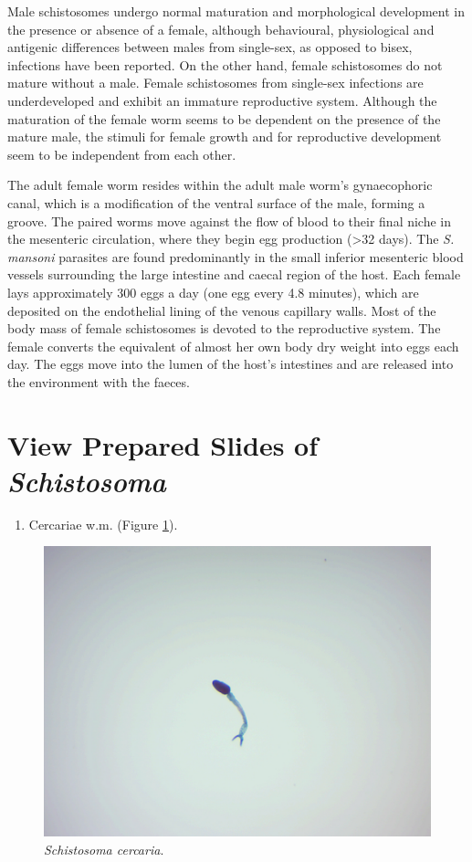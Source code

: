 Male schistosomes undergo normal maturation and morphological
development in the presence or absence of a female, although
behavioural, physiological and antigenic differences between males from
single-sex, as opposed to bisex, infections have been reported. On the
other hand, female schistosomes do not mature without a male. Female
schistosomes from single-sex infections are underdeveloped and exhibit
an immature reproductive system. Although the maturation of the female
worm seems to be dependent on the presence of the mature male, the
stimuli for female growth and for reproductive development seem to be
independent from each other.

The adult female worm resides within the adult male worm's gynaecophoric
canal, which is a modification of the ventral surface of the male,
forming a groove. The paired worms move against the flow of blood to
their final niche in the mesenteric circulation, where they begin egg
production (\textgreater{}32 days). The \emph{S. mansoni} parasites are found
predominantly in the small inferior mesenteric blood vessels surrounding
the large intestine and caecal region of the host. Each female lays
approximately 300 eggs a day (one egg every 4.8 minutes), which are
deposited on the endothelial lining of the venous capillary walls. Most
of the body mass of female schistosomes is devoted to the reproductive
system. The female converts the equivalent of almost her own body dry
weight into eggs each day. The eggs move into the lumen of the host's
intestines and are released into the environment with the faeces.

\section{\texorpdfstring{View Prepared Slides of
\emph{Schistosoma}}{View Prepared Slides of Schistosoma}}\label{view-prepared-slides-of-schistosoma}

\begin{enumerate}
\def\labelenumi{\arabic{enumi}.}
\tightlist
\item
  Cercariae w.m. (Figure \ref{fig:cercaria}).
\end{enumerate}

\begin{figure}

{\centering \includegraphics[width=0.7\linewidth]{./figures/rotifera/cercaria}

}

\caption{\emph{Schistosoma cercaria}.}\label{fig:cercaria}
\end{figure}

